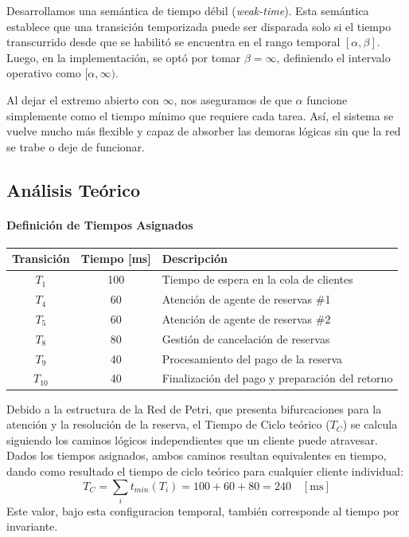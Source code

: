 \documentclass[11pt,a4paper]{article}
\begin{document}
Desarrollamos una semántica de tiempo débil (\textit{weak-time}). Esta semántica establece que una transición temporizada puede ser disparada solo si el tiempo transcurrido desde que se habilitó se encuentra en el rango temporal $[\alpha, \beta]$. Luego, en la implementación, se optó por tomar $\beta = \infty$, definiendo el intervalo operativo como $[\alpha, \infty)$. 

Al dejar el extremo abierto con $\infty$, nos aseguramos de que $\alpha$ funcione simplemente como el tiempo mínimo que requiere cada tarea. Así, el sistema se vuelve mucho más flexible y capaz de absorber las demoras lógicas sin que la red se trabe o deje de funcionar.

\subsection{Análisis Teórico}

\paragraph{Definición de Tiempos Asignados}

\begin{table}[H]
\centering
\begin{tabular}{cc l}
\toprule
\textbf{Transición} & \textbf{Tiempo [ms]} & \textbf{Descripción} \\ \midrule
$T_1$ & 100 & Tiempo de espera en la cola de clientes \\
$T_4$ & 60 & Atención de agente de reservas \#1 \\
$T_5$ & 60 & Atención de agente de reservas \#2 \\
$T_8$ & 80 & Gestión de cancelación de reservas \\
$T_9$ & 40 & Procesamiento del pago de la reserva \\
$T_{10}$ & 40 & Finalización del pago y preparación del retorno \\ \bottomrule
\end{tabular}
\end{table}

Debido a la estructura de la Red de Petri, que presenta bifurcaciones para la atención y la resolución de la reserva, el Tiempo de Ciclo teórico ($T_C$) se calcula siguiendo los caminos lógicos independientes que un cliente puede atravesar. Dados los tiempos asignados, ambos caminos resultan equivalentes en tiempo, dando como resultado el tiempo de ciclo teórico para cualquier cliente individual: $$T_C=\sum_it_{min}(T_i)=100+60+80=240\quad[\text{ms}]$$
Este valor, bajo esta configuracion temporal, también corresponde al tiempo por invariante.
\end{document}
